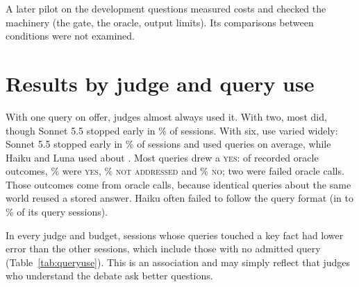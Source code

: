 A later pilot on the development questions measured costs and checked the machinery (the gate, the oracle, output
limits). Its comparisons between conditions were not examined.

\section{Results by judge and query use}
\label{app:judges}

\begin{table}[h]
\centering
\caption{Error (\%) by judge and condition, with 95\% intervals in parentheses. $\infty$ marks an interval with no
finite upper limit (the interval procedure breaks down when a judge makes almost no errors); ``n/a'' marks an
interval that could not be computed because the judge made no errors.}
\label{tab:byjudge}
\resizebox{\linewidth}{!}{}
\end{table}

\begin{table}[h]
\centering
\caption{How judges used their queries. ``Touched a key fact'' means that at least one admitted query overlapped in
wording with one of the facts the correct answer rests on. ``Mean used'' counts queries that were admitted and
answered, so a slot lost to two rejections is not counted. The last two columns are observational: word overlap
does not show that a query verified anything. ``Touched none'' includes sessions in which no query was admitted.}
\label{tab:queryuse}
\resizebox{\linewidth}{!}{}
\end{table}

With one query on offer, judges almost always used it. With two, most did, though Sonnet 5.5 stopped early in
\sonnetEarlyDoneTwo\% of sessions. With six, use varied widely: Sonnet 5.5 stopped early in \sonnetEarlyDoneSix\% of
sessions and used \meanUsedSixLo{} queries on average, while Haiku and Luna used about \meanUsedSixHi. Most queries
drew a \textsc{yes}: of \nOracleAnswers{} recorded oracle outcomes, \oracleYesShare\% were \textsc{yes},
\oracleNaShare\% \textsc{not addressed} and \oracleNoShare\% \textsc{no}; two were failed oracle calls. Those outcomes
come from \oracleCalls{} oracle calls, because identical queries about the same world reused a stored answer. Haiku
often failed to follow the query format (in \haikuMalformedLo{} to \haikuMalformedHi\% of its query sessions).

In every judge and budget, sessions whose queries touched a key fact had lower error than the other sessions, which
include those with no admitted query (Table~\ref{tab:queryuse}). This is an association and may simply reflect that
judges who understand the debate ask better questions.


